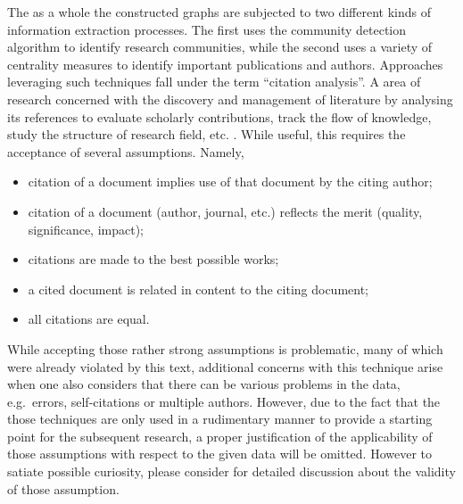 \documentclass[11pt,a4paper]{book}
\theoremstyle{definition}
\theoremstyle{definition}
\theoremstyle{definition}
\theoremstyle{remark}
\begin{document}
The as a whole the constructed graphs are subjected to two different kinds of information extraction processes. The first uses the community detection algorithm to identify research communities, while the second uses a variety of centrality measures to identify important publications and authors. 
Approaches leveraging such techniques fall under the term ``citation analysis''. A area of research concerned with the discovery and management of literature by analysing its references to evaluate scholarly contributions, track the flow of knowledge, study the structure of research field, etc. \parencite[p.~1-5]{zhao2015analysis}. While useful, this requires the acceptance of several assumptions. Namely,
\begin{itemize}
\item citation of a document implies use of that document by the citing author;
\item citation of a document (author, journal, etc.) reflects the merit (quality, significance, impact);
\item citations are made to the best possible works;
\item a cited document is related in content to the citing document;
\item all citations are equal.
\end{itemize}
While accepting those rather strong assumptions is problematic, many of which were already violated by this text, additional concerns with this technique arise when one also considers that there can be various problems in the data, e.g.\ errors, self-citations or multiple authors. However, due to the fact that the those techniques are only used in a rudimentary manner to provide a starting point for the subsequent research, a proper justification of the applicability of those assumptions with respect to the given data will be omitted. However to satiate possible curiosity, please consider \parencite{smith1981citation} for detailed discussion about the validity of those assumption.
\end{document}
